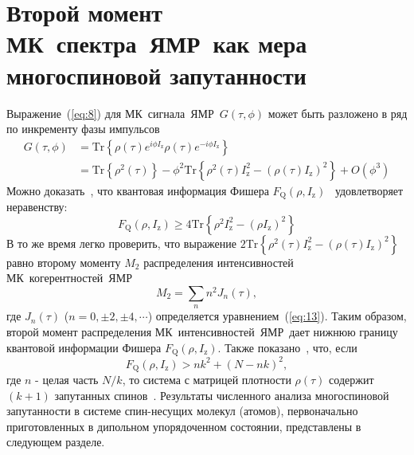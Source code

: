 \documentclass[utf8]{jetp}
\begin{document}
\section{Второй момент МК~спектра~ЯМР~как мера многоспиновой запутанности}
\label{sec:4}

Выражение~(\ref{eq:8}) для МК~сигнала~ЯМР~$G(\tau,\phi)$ может быть разложено в ряд по инкременту фазы импульсов
%
\begin{equation}
  \begin{split}
    \label{eq:17}
    G(\tau,\phi)
    & = \mathrm{Tr} \left\{
      \rho(\tau) e^{i \phi I_\mathrm{z} }
      \rho(\tau) e^{-i\phi I_\mathrm{z}}
    \right\} \\
    & = \mathrm{Tr} \left\{ \rho^2(\tau) \right\}
    - \phi^2 \mathrm{Tr} \left\{
      \rho^2(\tau) I^2_\mathrm{z}
      - (\rho(\tau) I_\mathrm{z})^2
    \right\}
    + O(\phi^3)
  \end{split}
\end{equation}
%
Можно доказать~\cite{Girolami_2017}, что квантовая информация Фишера $F_\mathrm{Q}(\rho,I_\mathrm{z})$~\cite{Helstrom_1976} удовлетворяет неравенству:
%
\begin{equation}
  \label{eq:18}
  F_\mathrm{Q}(\rho,I_\mathrm{z}) \geq 4 \mathrm{Tr} \left\{ \rho^2 I^2_\mathrm{z} - (\rho I_\mathrm{z})^2 \right\}
\end{equation}
%
В то же время легко проверить, что выражение $2 \mathrm{Tr} \left\{ \rho^2(\tau) I_\mathrm{z}^2 - \left( \rho(\tau) I_\mathrm{z} \right)^2 \right\}$ равно второму моменту $M_2$ распределения интенсивностей МК~когерентностей~ЯМР~\cite{Khitrin_1997}
%
\begin{equation}
  \label{eq:19}
  M_2 = \sum_{n} n^2 J_n (\tau) ,
\end{equation}
%
где $J_n(\tau)$ ($n=0,\pm 2, \pm 4, \cdots$) определяется уравнением~(\ref{eq:13}).
Таким образом, второй момент распределения МК~интенсивностей~ЯМР~дает нижнюю границу квантовой информации Фишера $F_\mathrm{Q}(\rho,I_\mathrm{z})$.
Также показано~\cite{T_th_2014,Pezz__2018}, что, если
%
\begin{equation}
  \label{eq:20}
  F_\mathrm{Q} (\rho,I_\mathrm{z}) > n k^2 + (N - n k)^2,
\end{equation}
%
где $n$ - целая часть ${N/k}$, то система с матрицей плотности $\rho(\tau)$ содержит  $(k+1)$ запутанных спинов~\cite{Pezz__2009,Hyllus_2012,T_th_2012}.
Результаты численного анализа многоспиновой запутанности в системе спин-несущих молекул (атомов), первоначально приготовленных в дипольном упорядоченном состоянии, представлены в следующем разделе.
\end{document}
